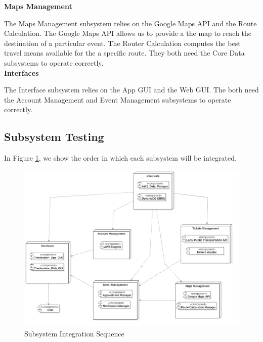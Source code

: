 \textbf{Maps Management}

The Maps Management subsystem relies on the Google Maps API and the Route Calculation. 
The Google Maps API allows us to provide a the map to reach the destination of a particular event.
The Router Calculation computes the best travel means available for the a specific route.
They both need the Core Data subsystems to operate correctly.\\

\textbf{Interfaces}

The Interface subsystem relies on the App GUI and the Web GUI.
The both need the Account Management and Event Management subsystems to operate correctly.

\subsection*{Subsystem Testing}
In Figure \ref{fig:intSequence}, we show the order in which each subsystem will be integrated.

\begin{figure}
	\centering
	\includegraphics[width=6in]{./diagrams/Integration_Sequence.png}
	\caption{Subsystem Integration Sequence}
	\label{fig:intSequence}
\end{figure}

\vspace*{30px}
